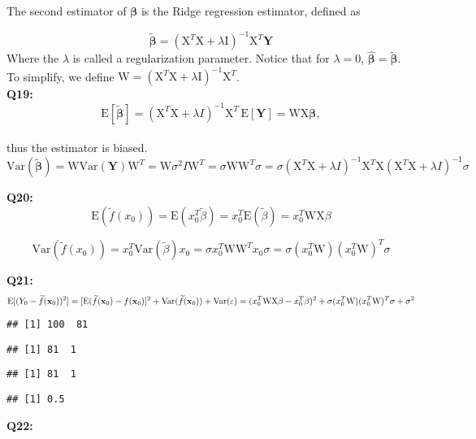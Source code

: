 \documentclass[]{article}
\begin{document}
The second estimator of \(\boldsymbol{\beta}\) is the Ridge regression
estimator, defined as

\[\widetilde{\boldsymbol \beta}=(\text{X}^T\text{X}+\lambda \text{I})^{-1}\text{X}^T{\mathbf Y}\]
Where the \(\lambda\) is called a regularization parameter. Notice that
for \(\lambda = 0\),
\(\boldsymbol{\hat{\beta}}=\boldsymbol{\widetilde{\beta}}\). To
simplify, we define
\(\text{W} = (\text{X}^T\text{X}+\lambda \text{I})^{-1}\text{X}^T\).\\
\textbf{Q19:}
\[\text{E}[\boldsymbol{\widetilde{\beta}}] = (\text{X}^T\text{X} + \lambda I)^{-1}\text{X}^T \, \text{E}[\mathbf{Y}] = \text{W}\text{X}\boldsymbol{\beta},\]\\
thus the estimator is biased.\\
\[\text{Var}(\boldsymbol{\widetilde{\beta}}) = \text{W} \text{Var}(\mathbf{Y})\text{W}^T = \text{W} \sigma^2 I \text{W}^T 
= \sigma \text{W}\text{W}^T \sigma = \sigma(\text{X}^T\text{X} + \lambda I)^{-1}\text{X}^T\text{X}(\text{X}^T\text{X}+\lambda I)^{-1}\sigma\]

\textbf{Q20:}
\[\text{E}(\widetilde{f}(x_0)) = \text{E}(x_0^T \widetilde{\beta}) = x_0^T\text{E}(\widetilde{\beta})=x_0^T\text{W}\text{X}\beta\]

\[\text{Var}(\widetilde{f}(x_0)) = x_0^T\text{Var}(\widetilde{\beta})x_0 = \sigma x_0^T \text{W} \text{W}^T x_0 \sigma = \sigma (x_0^T\text{W})(x_0^T\text{W})^T\sigma\]

\textbf{Q21:}
\[\text{E}[(Y_0-\widetilde{f}({\bf x}_0))^2]=[\text{E}(\widetilde{f}({\bf x}_0)-f({\bf x}_0)]^2+\text{Var}(\widetilde{f}({\bf x}_0) ) + \text{Var}(\varepsilon) = (x_0^T\text{W}\text{X}\beta - x_0^T\beta)^2 + \sigma (x_0^T\text{W})(x_0^T\text{W})^T\sigma + \sigma^2\]

\begin{verbatim}
## [1] 100  81
\end{verbatim}

\begin{verbatim}
## [1] 81  1
\end{verbatim}

\begin{verbatim}
## [1] 81  1
\end{verbatim}

\begin{verbatim}
## [1] 0.5
\end{verbatim}

\textbf{Q22:}
\end{document}
